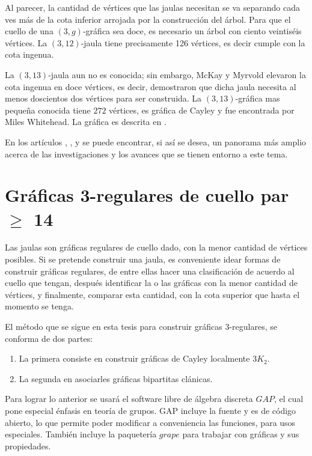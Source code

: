 \documentclass[12pt]{book}
\theoremstyle{definition}
\begin{document}
Al parecer, la cantidad de vértices que las jaulas necesitan se va
separando cada ves más de la cota inferior arrojada por la
construcción del árbol. Para que el cuello de una $(3,g)$-gráfica sea
doce, es necesario un árbol con ciento veintiséis vértices. La
$(3,12)$-jaula tiene precisamente 126 vértices, es decir cumple con la
cota ingenua.


La $(3,13)$-jaula aun no es conocida; sin embargo, McKay y Myrvold
elevaron la cota ingenua en doce vértices, es decir, demostraron que
dicha jaula necesita al menos doscientos dos vértices para ser
construida. La $(3,13)$-gráfica mas pequeña conocida tiene $272$
vértices, es gráfica de Cayley y fue encontrada por Miles
Whitehead. La gráfica es descrita en \cite{cgcuellogrande}. 


En los artículos \cite{Asurvey}, \cite{Exoo}, \cite{cgcuellogrande} y
\cite{cubicasconcuellogrande} se puede encontrar, si así se desea, un
panorama más amplio acerca de las investigaciones y los avances que
se tienen entorno a este tema.

\chapter{Gráficas 3-regulares de cuello par $\geq$ 14}

Las jaulas son gráficas regulares de cuello dado, con la menor cantidad de
vértices posibles. Si se pretende construir una jaula, es conveniente
idear formas de construir gráficas regulares, de entre ellas hacer
una clasificación de acuerdo al cuello que tengan, después identificar
la o las gráficas con la menor cantidad de vértices, y
finalmente, comparar esta cantidad, con la cota superior que hasta el
momento se tenga.   

El método que se sigue en esta tesis para construir gráficas
3-regulares, se conforma de dos partes:

\begin{enumerate}
\item La primera consiste en
construir gráficas de Cayley localmente $3K_2$.
\item La segunda en asociarles gráficas bipartitas
clánicas.
\end{enumerate}

 Para lograr lo anterior se usará el software libre de álgebra
 discreta $GAP$, el cual pone especial énfasis en teoría de grupos. GAP
 incluye la fuente y es de código abierto, lo que permite poder
 modificar a conveniencia las funciones, para usos especiales. También
 incluye la paquetería $grape$ para trabajar con gráficas y sus
 propiedades. 
\end{document}
